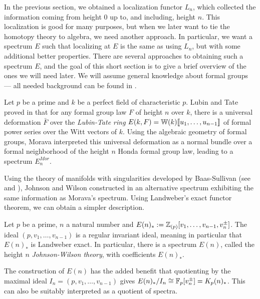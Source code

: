 In the previous section, we obtained a localization functor $L_n$, which collected the information coming from height $0$ up to, and including, height $n$. This localization is good for many purposes, but when we later want to tie the homotopy theory to algebra, we need another approach. In particular, we want a spectrum $E$ such that localizing at $E$ is the same as using $L_n$, but with some additional better properties. There are several approaches to obtaining such a spectrum $E$, and the goal of this short section is to give a brief overview of the ones we will need later. We will assume general knowledge about formal groups --- all needed background can be found in \cite[Appendix 2]{ravenel_86}. 

\begin{remark}
    Let $p$ be a prime and $k$ be a perfect field of characteristic $p$. Lubin and Tate proved in \cite{lubin-tate_66} that for any formal group law $F$ of height $n$ over $k$, there is a universal deformation $\bar{F}$ over the \emph{Lubin-Tate ring} $E(k, F)=\mathbb{W}(k)[\![ u_1, \ldots, u_{n-1}]\!]$ of formal power series over the Witt vectors of $k$. Using the algebraic geometry of formal groups, Morava interpreted this universal deformation as a normal bundle over a formal neighborhood of the height $n$ Honda formal group law, leading to a spectrum $E^{Mor}_n$. 
\end{remark} 

Using the theory of manifolds with singularities developed by Baas-Sullivan (see \cite{baas_73a} and \cite{baas_73b}), Johnson and Wilson constructed in \cite{johnson-wilson_75} an alternative spectrum exhibiting the same information as Morava's spectrum. Using Landweber's exact functor theorem, we can obtain a simpler description. 

\begin{definition}
    Let $p$ be a prime, $n$ a natural number and $E(n)_* := \mathbb{Z}_{(p)}[v_1, \ldots, v_{n-1}, v_n^{\pm}]$. The ideal $(p, v_1, \ldots, v_{n-1})$ is a regular invariant ideal, meaning in particular that $E(n)_*$ is Landweber exact. In particular, there is a spectrum $E(n)$, called the height $n$ \emph{Johnson-Wilson theory}, with coefficients $E(n)_*$. 
\end{definition}

\begin{remark}
    \label{ch0:rm:K-as-quotient-of-E}
    The construction of $E(n)$ has the added benefit that quotienting by the maximal ideal $I_n = (p, v_1, \ldots, v_{n-1})$ gives $E(n)_*/I_n \cong \mathbb{F}_p[v_n^{\pm}] = K_p(n)_*$. This can also be suitably interpreted as a quotient of spectra. 
\end{remark}


